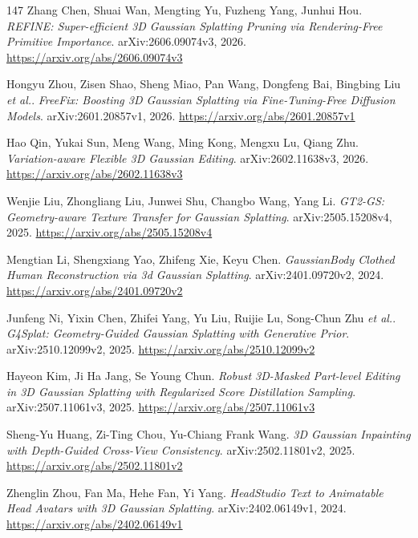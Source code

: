 \documentclass[11pt,a4paper]{article}
\begin{document}
\begin{thebibliography}{147}
Zhang Chen, Shuai Wan, Mengting Yu, Fuzheng Yang, Junhui Hou.
\newblock \emph{REFINE: Super-efficient 3D Gaussian Splatting Pruning via Rendering-Free Primitive Importance}.
\newblock arXiv:2606.09074v3, 2026.
\newblock \url{https://arxiv.org/abs/2606.09074v3}

Hongyu Zhou, Zisen Shao, Sheng Miao, Pan Wang, Dongfeng Bai, Bingbing Liu \emph{et al.}.
\newblock \emph{FreeFix: Boosting 3D Gaussian Splatting via Fine-Tuning-Free Diffusion Models}.
\newblock arXiv:2601.20857v1, 2026.
\newblock \url{https://arxiv.org/abs/2601.20857v1}

Hao Qin, Yukai Sun, Meng Wang, Ming Kong, Mengxu Lu, Qiang Zhu.
\newblock \emph{Variation-aware Flexible 3D Gaussian Editing}.
\newblock arXiv:2602.11638v3, 2026.
\newblock \url{https://arxiv.org/abs/2602.11638v3}

Wenjie Liu, Zhongliang Liu, Junwei Shu, Changbo Wang, Yang Li.
\newblock \emph{GT2-GS: Geometry-aware Texture Transfer for Gaussian Splatting}.
\newblock arXiv:2505.15208v4, 2025.
\newblock \url{https://arxiv.org/abs/2505.15208v4}

Mengtian Li, Shengxiang Yao, Zhifeng Xie, Keyu Chen.
\newblock \emph{GaussianBody Clothed Human Reconstruction via 3d Gaussian Splatting}.
\newblock arXiv:2401.09720v2, 2024.
\newblock \url{https://arxiv.org/abs/2401.09720v2}

Junfeng Ni, Yixin Chen, Zhifei Yang, Yu Liu, Ruijie Lu, Song-Chun Zhu \emph{et al.}.
\newblock \emph{G4Splat: Geometry-Guided Gaussian Splatting with Generative Prior}.
\newblock arXiv:2510.12099v2, 2025.
\newblock \url{https://arxiv.org/abs/2510.12099v2}

Hayeon Kim, Ji Ha Jang, Se Young Chun.
\newblock \emph{Robust 3D-Masked Part-level Editing in 3D Gaussian Splatting with Regularized Score Distillation Sampling}.
\newblock arXiv:2507.11061v3, 2025.
\newblock \url{https://arxiv.org/abs/2507.11061v3}

Sheng-Yu Huang, Zi-Ting Chou, Yu-Chiang Frank Wang.
\newblock \emph{3D Gaussian Inpainting with Depth-Guided Cross-View Consistency}.
\newblock arXiv:2502.11801v2, 2025.
\newblock \url{https://arxiv.org/abs/2502.11801v2}

Zhenglin Zhou, Fan Ma, Hehe Fan, Yi Yang.
\newblock \emph{HeadStudio Text to Animatable Head Avatars with 3D Gaussian Splatting}.
\newblock arXiv:2402.06149v1, 2024.
\newblock \url{https://arxiv.org/abs/2402.06149v1}


\end{thebibliography}
\end{document}
